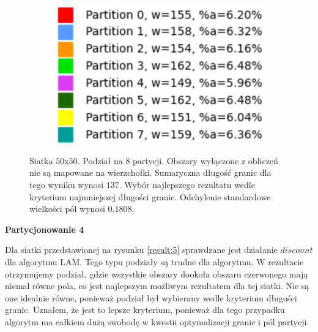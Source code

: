 \begin{figure}[h]
\begin{subfigure}{.33\textwidth}
    \centering
    \includegraphics[width=0.9\linewidth]{images/results/m_k/with/1/results}
    \caption[short]{}
\end{subfigure}
\caption{Siatka $50$x$50$. Podział na $8$ partycji. Obszary wyłączone z obliczeń nie są mapowane na wierzchołki.
Sumaryczna długość granic dla tego wyniku wynosi $137$.
Wybór najlepszego rezultatu wedle kryterium najmniejszej długości granic.
Odchylenie standardowe wielkości pól wynosi $0.1808$.}
\label{result:1}
\end{figure}

\newpage
\vspace{3mm}
\textbf{Partycjonowanie 4}
\vspace{1mm}

Dla siatki przedstawionej na rysunku \ref{result:5} sprawdzane jest działanie $discount$ dla algorytmu LAM.
Tego typu podziały są trudne dla algorytmu.
W rezultacie otrzymujemy podział, gdzie wszystkie obszary dookoła obszaru czerwonego mają niemal równe pola, co jest
najlepszym możliwym rezultatem dla tej siatki.
Nie są one idealnie równe, ponieważ podział był wybierany wedle kryterium długości granic.
Uznałem, że jest to lepsze kryterium, ponieważ dla tego przypadku algorytm ma całkiem dużą swobodę w kwestii optymalizacji granic i
pól partycji.

